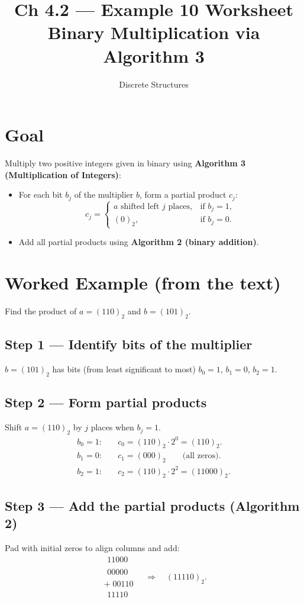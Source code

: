 \documentclass[12pt]{article}
\title{Ch 4.2 — Example 10 Worksheet\\Binary Multiplication via Algorithm 3}
\author{Discrete Structures}
\date{}
\begin{document}
\maketitle

\section*{Goal}
Multiply two positive integers given in binary using \textbf{Algorithm 3 (Multiplication of Integers)}:
\begin{itemize}
  \item For each bit $b_j$ of the multiplier $b$, form a partial product $c_j$:
        \[
           c_j = \begin{cases}
             a \text{ shifted left $j$ places}, & \text{if } b_j=1,\\
             (0)_2, & \text{if } b_j=0.
           \end{cases}
        \]
  \item Add all partial products using \textbf{Algorithm 2 (binary addition)}.
\end{itemize}

\section*{Worked Example (from the text)}
Find the product of $a=(110)_2$ and $b=(101)_2$.

\subsection*{Step 1 — Identify bits of the multiplier}
$b=(101)_2$ has bits (from least significant to most) $b_0=1$, $b_1=0$, $b_2=1$.

\subsection*{Step 2 — Form partial products}
Shift $a=(110)_2$ by $j$ places when $b_j=1$.
\[
\begin{aligned}
b_0=1:&\quad c_0 = (110)_2 \cdot 2^0 = (110)_2.\\[4pt]
b_1=0:&\quad c_1 = (000)_2 \qquad\text{(all zeros)}.\\[4pt]
b_2=1:&\quad c_2 = (110)_2 \cdot 2^2 = (11000)_2.
\end{aligned}
\]

\subsection*{Step 3 — Add the partial products (Algorithm 2)}
Pad with initial zeros to align columns and add:
\[
\begin{array}{r}
\phantom{(}11000\phantom{)}\\
\phantom{(}00000\phantom{)}\\
+ \; 00110\\ \hline
\phantom{(}11110
\end{array}
\quad\Rightarrow\quad (11110)_2.
\]
\end{document}
